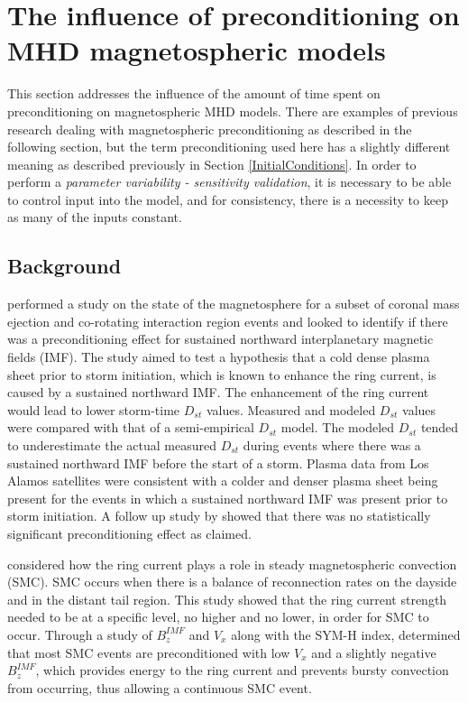 \section[Preconditioning]{The influence of preconditioning on MHD magnetospheric
models} This section addresses the influence of the amount of time spent on preconditioning
on magnetospheric MHD models. There are examples of previous research dealing
with magnetospheric preconditioning as described in the following section, but
the term preconditioning used here has a slightly different meaning as
described previously in Section \ref{InitialConditions}. In order to perform a
\textit{parameter variability - sensitivity validation}, it is necessary to be able to
control input into the model, and for consistency, there is a necessity to keep
as many of the inputs constant.

\subsection{Background}
\citet{Lavraud2006} performed a study on the state of the magnetosphere for a
subset of coronal mass ejection and co-rotating interaction region events and
looked to identify if there was a preconditioning effect for sustained northward
interplanetary magnetic fields (IMF). The study aimed to test a hypothesis that
a cold dense plasma sheet prior to storm initiation, which is known to enhance the
ring current, is caused by a sustained northward IMF. The enhancement of the
ring current would lead to lower storm-time $D_{st}$ values. Measured and
modeled $D_{st}$ values were compared with that of a semi-empirical $D_{st}$
model. The modeled $D_{st}$ tended to underestimate the actual measured $D_{st}$
during events where there was a sustained northward IMF before the start of a
storm. Plasma data from Los Alamos satellites were consistent with a colder and
denser plasma sheet being present for the events in which a sustained northward
IMF was present prior to storm initiation. A follow up study by
\cite{Weigel2010} showed that there was no statistically significant
preconditioning effect as claimed.

\citet{Juusola2013} considered how the ring current plays a role in steady
magnetospheric convection (SMC). SMC occurs when there is a balance of
reconnection rates on the dayside and in the distant tail region. This study
showed that the ring current strength needed to be at a specific level, no
higher and no lower, in order for SMC to occur. Through a study of $B_z^{IMF}$ and
$V_x$ along with the SYM-H index, \citet{Juusola2013} determined that most SMC events are
preconditioned with low $V_x$ and a slightly negative $B_z^{IMF}$, which provides
energy to the ring current and prevents bursty convection from occurring, thus
allowing a continuous SMC event.

